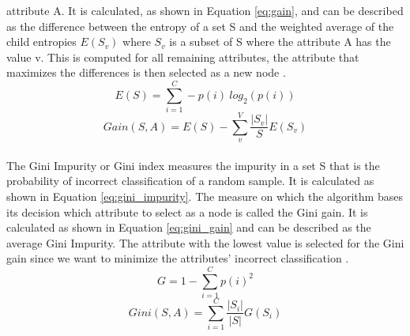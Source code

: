 attribute A.  It is calculated, as shown in Equation \ref{eq:gain}, and can be 
described as the difference between the entropy of a set S and the 
weighted average of the child entropies $E(S_v)$ where $S_v$ is a subset of S 
where the attribute A has the value v. This is computed for all remaining 
attributes, the attribute that maximizes the differences is then selected as a 
new node \cite{RN165}.
\begin{equation}
 E(S) = \sum_{i=1}^C -p(i) \ log_2(p(i))
 \label{eq:entropy}
\end{equation}
\begin{equation}
 Gain(S, A) = E(S) - \sum_{v}^{V} \frac{|S_v|}{S} E(S_v)
 \label{eq:gain}
\end{equation}
\\
The Gini Impurity or Gini index measures the impurity in a set S that is the 
probability of incorrect classification of a random sample. It is calculated 
as shown in Equation \ref{eq:gini_impurity}. The measure on which the algorithm 
bases its decision which attribute to select as a node is called the Gini 
gain. It is calculated as shown in Equation \ref{eq:gini_gain} and can be 
described as the average Gini Impurity. The attribute with the lowest value is 
selected for the Gini gain since we want to minimize the attributes' incorrect 
classification \cite{RN171}.
\begin{equation}
 G = 1 - \sum_{i=1}^C p(i)^2
 \label{eq:gini_impurity}
\end{equation}
\begin{equation}
 Gini(S, A) = \sum_{i=1}^C \frac{|S_i|}{|S|} G(S_i)
 \label{eq:gini_gain}
\end{equation}
\\
